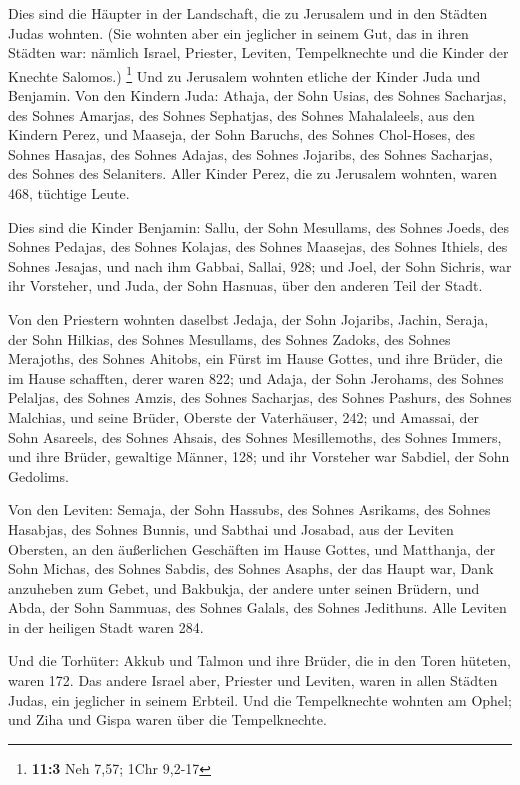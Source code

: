  Dies sind die Häupter in der Landschaft, die zu Jerusalem
und in den Städten Judas wohnten. (Sie wohnten aber ein jeglicher in
seinem Gut, das in ihren Städten war: nämlich Israel, Priester, Leviten,
Tempelknechte und die Kinder der Knechte Salomos.) \footnote{\textbf{11:3}
  Neh 7,57; 1Chr 9,2-17}  Und zu Jerusalem wohnten etliche
der Kinder Juda und Benjamin. Von den Kindern Juda: Athaja, der Sohn
Usias, des Sohnes Sacharjas, des Sohnes Amarjas, des Sohnes Sephatjas,
des Sohnes Mahalaleels, aus den Kindern Perez,  und
Maaseja, der Sohn Baruchs, des Sohnes Chol-Hoses, des Sohnes Hasajas,
des Sohnes Adajas, des Sohnes Jojaribs, des Sohnes Sacharjas, des Sohnes
des Selaniters.  Aller Kinder Perez, die zu Jerusalem
wohnten, waren 468, tüchtige Leute.

 Dies sind die Kinder Benjamin: Sallu, der Sohn Mesullams,
des Sohnes Joeds, des Sohnes Pedajas, des Sohnes Kolajas, des Sohnes
Maasejas, des Sohnes Ithiels, des Sohnes Jesajas,  und
nach ihm Gabbai, Sallai, 928;  und Joel, der Sohn Sichris,
war ihr Vorsteher, und Juda, der Sohn Hasnuas, über den anderen Teil der
Stadt.

 Von den Priestern wohnten daselbst Jedaja, der Sohn
Jojaribs, Jachin,  Seraja, der Sohn Hilkias, des Sohnes
Mesullams, des Sohnes Zadoks, des Sohnes Merajoths, des Sohnes Ahitobs,
ein Fürst im Hause Gottes,  und ihre Brüder, die im Hause
schafften, derer waren 822; und Adaja, der Sohn Jerohams, des Sohnes
Pelaljas, des Sohnes Amzis, des Sohnes Sacharjas, des Sohnes Pashurs,
des Sohnes Malchias,  und seine Brüder, Oberste der
Vaterhäuser, 242; und Amassai, der Sohn Asareels, des Sohnes Ahsais, des
Sohnes Mesillemoths, des Sohnes Immers,  und ihre Brüder,
gewaltige Männer, 128; und ihr Vorsteher war Sabdiel, der Sohn Gedolims.

 Von den Leviten: Semaja, der Sohn Hassubs, des Sohnes
Asrikams, des Sohnes Hasabjas, des Sohnes Bunnis,  und
Sabthai und Josabad, aus der Leviten Obersten, an den äußerlichen
Geschäften im Hause Gottes,  und Matthanja, der Sohn
Michas, des Sohnes Sabdis, des Sohnes Asaphs, der das Haupt war, Dank
anzuheben zum Gebet, und Bakbukja, der andere unter seinen Brüdern, und
Abda, der Sohn Sammuas, des Sohnes Galals, des Sohnes Jedithuns.
 Alle Leviten in der heiligen Stadt waren 284.

 Und die Torhüter: Akkub und Talmon und ihre Brüder, die
in den Toren hüteten, waren 172.  Das andere Israel aber,
Priester und Leviten, waren in allen Städten Judas, ein jeglicher in
seinem Erbteil.  Und die Tempelknechte wohnten am Ophel;
und Ziha und Gispa waren über die Tempelknechte.

